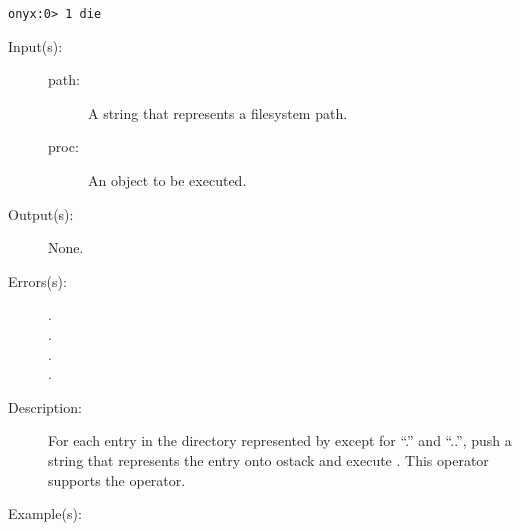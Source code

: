 \begin{description}
\begin{description}
\begin{verbatim}
onyx:0> 1 die
		\end{verbatim}
	\end{description}
\label{systemdict:dirforeach}
\item[{\onyxop{path proc}{dirforeach}{--}}: ]
	\begin{description}\item[]
	\item[Input(s): ]
		\begin{description}\item[]
		\item[path: ]
			A string that represents a filesystem path.
		\item[proc: ]
			An object to be executed.
		\end{description}
	\item[Output(s): ] None.
	\item[Errors(s): ]
		\begin{description}\item[]
		\item[.]
		\item[.]
		\item[.]
		\item[.]
		\end{description}
	\item[Description: ]
		For each entry in the directory represented by 
		except for ``.'' and ``..'', push a string that represents the
		entry onto ostack and execute .  This operator
		supports the 
		operator.
	\item[Example(s): ]\begin{verbatim}


\end{verbatim}
\end{description}
\end{description}
